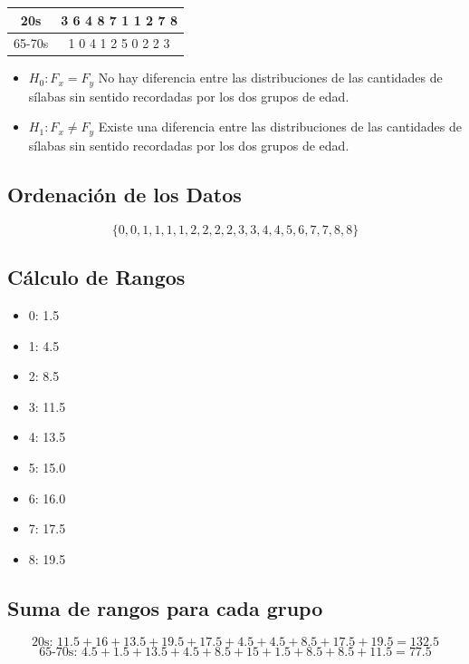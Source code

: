 \documentclass{article}
\begin{document}
\begin{center}
    \begin{tabular}{c|c}
        20s    & 3 6 4 8 7 1 1 2 7 8 \\
        \hline
        65-70s & 1 0 4 1 2 5 0 2 2 3
    \end{tabular}
\end{center}

\begin{itemize}
    \item $H_0: F_x = F_y$ No hay diferencia entre las distribuciones de las cantidades de sílabas sin sentido recordadas por los dos grupos de edad.
    \item $H_1: F_x \neq F_y$ Existe una diferencia entre las distribuciones de las cantidades de sílabas sin sentido recordadas por los dos grupos de edad.
\end{itemize}

\subsection*{Ordenación de los Datos}

\[
    \{0, 0, 1, 1, 1, 1, 2, 2, 2, 2, 3, 3, 4, 4, 5, 6, 7, 7, 8, 8\}
\]

\subsection*{Cálculo de Rangos}

\begin{itemize}
    \item 0: 1.5
    \item 1: 4.5
    \item 2: 8.5
    \item 3: 11.5
    \item 4: 13.5
    \item 5: 15.0
    \item 6: 16.0
    \item 7: 17.5
    \item 8: 19.5
\end{itemize}

\subsection*{Suma de rangos para cada grupo}

\[ \text{20s: } 11.5 + 16 + 13.5 + 19.5 + 17.5 + 4.5 + 4.5 + 8.5 + 17.5 + 19.5 = 132.5 \]
\[ \text{65-70s: } 4.5 + 1.5 + 13.5 + 4.5 + 8.5 + 15 + 1.5 + 8.5 + 8.5 + 11.5 = 77.5\]
\end{document}
